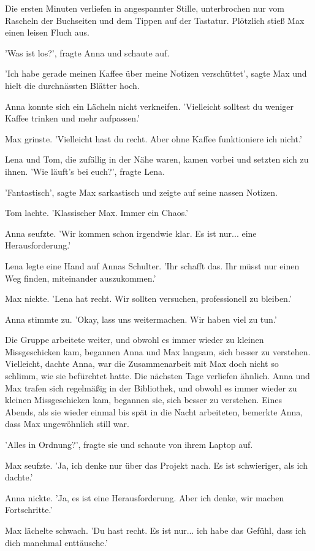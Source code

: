 \documentclass[12pt]{article}
\begin{document}
Die ersten Minuten verliefen in angespannter Stille, unterbrochen nur vom Rascheln der Buchseiten und dem Tippen auf der Tastatur. Plötzlich stieß Max einen leisen Fluch aus.

'Was ist los?', fragte Anna und schaute auf.

'Ich habe gerade meinen Kaffee über meine Notizen verschüttet', sagte Max und hielt die durchnässten Blätter hoch.

Anna konnte sich ein Lächeln nicht verkneifen. 'Vielleicht solltest du weniger Kaffee trinken und mehr aufpassen.'

Max grinste. 'Vielleicht hast du recht. Aber ohne Kaffee funktioniere ich nicht.'

Lena und Tom, die zufällig in der Nähe waren, kamen vorbei und setzten sich zu ihnen. 'Wie läuft's bei euch?', fragte Lena.

'Fantastisch', sagte Max sarkastisch und zeigte auf seine nassen Notizen.

Tom lachte. 'Klassischer Max. Immer ein Chaos.'

Anna seufzte. 'Wir kommen schon irgendwie klar. Es ist nur... eine Herausforderung.'

Lena legte eine Hand auf Annas Schulter. 'Ihr schafft das. Ihr müsst nur einen Weg finden, miteinander auszukommen.'

Max nickte. 'Lena hat recht. Wir sollten versuchen, professionell zu bleiben.'

Anna stimmte zu. 'Okay, lass uns weitermachen. Wir haben viel zu tun.'

Die Gruppe arbeitete weiter, und obwohl es immer wieder zu kleinen Missgeschicken kam, begannen Anna und Max langsam, sich besser zu verstehen. Vielleicht, dachte Anna, war die Zusammenarbeit mit Max doch nicht so schlimm, wie sie befürchtet hatte. Die nächsten Tage verliefen ähnlich. Anna und Max trafen sich regelmäßig in der Bibliothek, und obwohl es immer wieder zu kleinen Missgeschicken kam, begannen sie, sich besser zu verstehen. Eines Abends, als sie wieder einmal bis spät in die Nacht arbeiteten, bemerkte Anna, dass Max ungewöhnlich still war.

'Alles in Ordnung?', fragte sie und schaute von ihrem Laptop auf.

Max seufzte. 'Ja, ich denke nur über das Projekt nach. Es ist schwieriger, als ich dachte.'

Anna nickte. 'Ja, es ist eine Herausforderung. Aber ich denke, wir machen Fortschritte.'

Max lächelte schwach. 'Du hast recht. Es ist nur... ich habe das Gefühl, dass ich dich manchmal enttäusche.'
\end{document}
